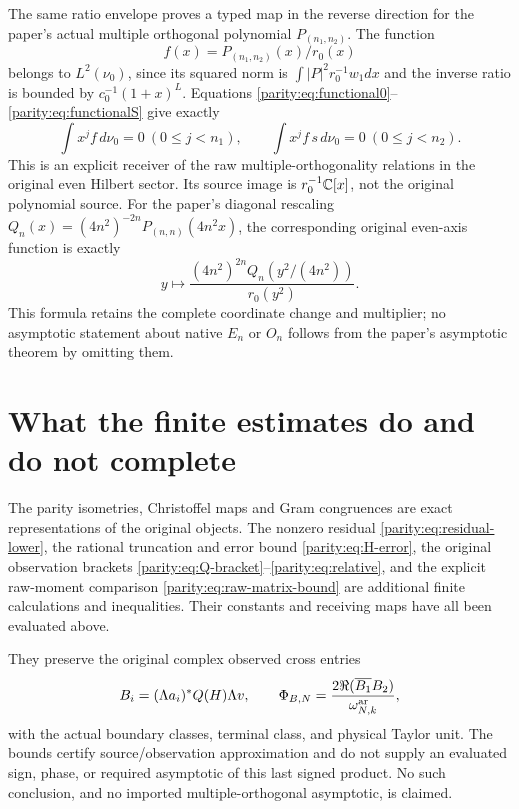 The same ratio envelope proves a typed map in the reverse
direction for the paper's actual multiple orthogonal polynomial
$P_{(n_1,n_2)}$. The function
\[
 f(x)=P_{(n_1,n_2)}(x)/r_0(x)
\]
belongs to $L^2(\nu_0)$, since its squared norm is
$\int |P|^2r_0^{-1}w_1dx$ and the inverse ratio is bounded by
$c_0^{-1}(1+x)^L$. Equations
\eqref{parity:eq:functional0}--\eqref{parity:eq:functionalS} give exactly
\[
 \int x^jf\,d\nu_0=0\ (0\leq j<n_1),\qquad
 \int x^jf\,s\,d\nu_0=0\ (0\leq j<n_2).
\]
This is an explicit receiver of the raw multiple-orthogonality
relations in the original even Hilbert sector. Its source image
is $r_0^{-1}\mathbb C[x]$, not the original polynomial source. For the
paper's diagonal rescaling
$Q_n(x)=(4n^2)^{-2n}P_{(n,n)}(4n^2x)$, the corresponding original
even-axis function is exactly
\[
 y\longmapsto\frac{(4n^2)^{2n}Q_n(y^2/(4n^2))}{r_0(y^2)}.
\]
This formula retains the complete coordinate change and multiplier;
no asymptotic statement about native $E_n$ or $O_n$ follows from
the paper's asymptotic theorem by omitting them.

\section{What the finite estimates do and do not complete}

The parity isometries, Christoffel maps and Gram congruences are
exact representations of the original objects. The nonzero
residual \eqref{parity:eq:residual-lower}, the rational truncation and
error bound \eqref{parity:eq:H-error}, the original observation brackets
\eqref{parity:eq:Q-bracket}--\eqref{parity:eq:relative}, and the explicit
raw-moment comparison \eqref{parity:eq:raw-matrix-bound} are additional
finite calculations and inequalities. Their constants and
receiving maps have all been evaluated above.

They preserve the original complex observed cross entries
\[
 B_i=(\Lambda a_i)^*Q(H)\Lambda v,
 \qquad
 \Phi_{B,N}=\frac{2\Re(\overline{B_1}B_2)}{\omega_{N,k}^{\rm ar}},
\]
with the actual boundary classes, terminal class, and physical
Taylor unit. The bounds certify source/observation approximation
and do not supply an evaluated sign, phase, or required
asymptotic of this last signed product. No such conclusion, and
no imported multiple-orthogonal asymptotic, is claimed.

